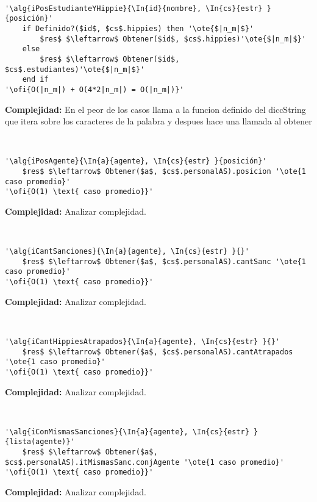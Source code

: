 ~


\begin{lstlisting}[mathescape]
'\alg{iPosEstudianteYHippie}{\In{id}{nombre}, \In{cs}{estr} }{posición}'
	if Definido?($id$, $cs$.hippies) then '\ote{$|n_m|$}'
		$res$ $\leftarrow$ Obtener($id$, $cs$.hippies)'\ote{$|n_m|$}'
	else
		$res$ $\leftarrow$ Obtener($id$, $cs$.estudiantes)'\ote{$|n_m|$}'
	end if
'\ofi{O(|n_m|) + O(4*2|n_m|) = O(|n_m|)}'
\end{lstlisting}

\textbf{Complejidad:} En el peor de los casos llama a la funcion definido del diccString que itera sobre los caracteres de la palabra y despues hace una llamada al obtener

~


\begin{lstlisting}[mathescape]
'\alg{iPosAgente}{\In{a}{agente}, \In{cs}{estr} }{posición}'
	$res$ $\leftarrow$ Obtener($a$, $cs$.personalAS).posicion '\ote{1 caso promedio}'
'\ofi{O(1) \text{ caso promedio}}'
\end{lstlisting}

\textbf{Complejidad:} Analizar complejidad.

~


\begin{lstlisting}[mathescape]
'\alg{iCantSanciones}{\In{a}{agente}, \In{cs}{estr} }{}'
	$res$ $\leftarrow$ Obtener($a$, $cs$.personalAS).cantSanc '\ote{1 caso promedio}'
'\ofi{O(1) \text{ caso promedio}}'
\end{lstlisting}

\textbf{Complejidad:} Analizar complejidad.

~


\begin{lstlisting}[mathescape]
'\alg{iCantHippiesAtrapados}{\In{a}{agente}, \In{cs}{estr} }{}'
	$res$ $\leftarrow$ Obtener($a$, $cs$.personalAS).cantAtrapados '\ote{1 caso promedio}'
'\ofi{O(1) \text{ caso promedio}}'
\end{lstlisting}

\textbf{Complejidad:} Analizar complejidad.

~


\begin{lstlisting}[mathescape]
'\alg{iConMismasSanciones}{\In{a}{agente}, \In{cs}{estr} }{lista(agente)}'
	$res$ $\leftarrow$ Obtener($a$, $cs$.personalAS).itMismasSanc.conjAgente '\ote{1 caso promedio}'
'\ofi{O(1) \text{ caso promedio}}'
\end{lstlisting}

\textbf{Complejidad:} Analizar complejidad.

